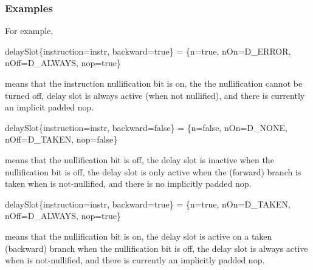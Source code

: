 \subsubsection{Examples}
  For example,
\begin{SML}
    delaySlot\{instruction=instr, backward=true\} =
    \{n=true, nOn=D_ERROR, nOff=D_ALWAYS, nop=true\}
\end{SML}
\noindent means that the instruction nullification bit is on, the
the nullification cannot be turned off, delay slot is always active 
(when not nullified), and there is currently an implicit padded nop.

\begin{SML}
   delaySlot\{instruction=instr, backward=false\} =
  \{n=false, nOn=D_NONE, nOff=D_TAKEN, nop=false\}
\end{SML}
\noindent means that the nullification bit is off, the delay slot
is inactive when the nullification bit is off,  the delay slot is only
active when the (forward) branch is taken when  is 
not-nullified, and there
is no implicitly padded nop.

\begin{SML}
   delaySlot\{instruction=instr, backward=true\} =
  \{n=true, nOn=D_TAKEN, nOff=D_ALWAYS, nop=true\}
\end{SML}
\noindent means that the nullification bit is on, the delay slot
is active on a taken (backward) branch when the nullification bit is off, 
the delay slot is always active when  is not-nullified, 
and there is currently an implicitly padded nop.

